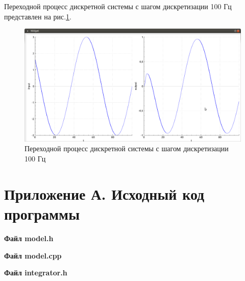 \documentclass[14pt,a4paper]{extreport}
\begin{document}
Переходной процесс дискретной системы с шагом дискретизации 
100 Гц представлен на рис.\ref{fig:discrete100}.

\begin{figure}[h]
    \centering
    \includegraphics[width=160mm]{img/100hz.png}
    \caption{Переходной процесс дискретной системы 
    с шагом дискретизации 100 Гц}
    \label{fig:discrete100}
\end{figure}


\newpage
\chapter*{Приложение А. Исходный код программы}

\textbf{Файл model.h}
\begin{alltt}
    
\end{alltt}

\textbf{Файл model.cpp}
\begin{alltt}
    
\end{alltt}

\textbf{Файл integrator.h}
\begin{alltt}
    
\end{alltt}
\end{document}
